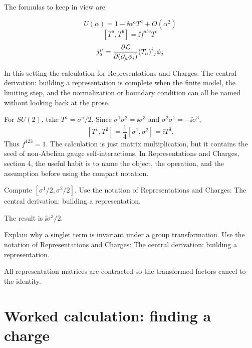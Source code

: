 The formulas to keep in view are

\[
  U(\alpha)=1-\ii\alpha^aT^a+O(\alpha^2)
\]
\[
  [T^a,T^b]=\ii f^{abc}T^c
\]
\[
  j^\mu_a=\frac{\partial\mathcal L}{\partial(\partial_\mu\phi_i)}(T_a)^i{}_j\phi_j
\]

In this setting the calculation for Representations and Charges: The central derivation: building a representation is complete when the finite model, the limiting step, and the normalization or boundary condition can all be named without looking back at the prose.




\begin{example}
For \(SU(2)\), take \(T^a=\sigma^a/2\).  Since \(\sigma^1\sigma^2=\ii\sigma^3\) and \(\sigma^2\sigma^1=-\ii\sigma^3\),
\[
  [T^1,T^2]=\frac14[\sigma^1,\sigma^2]=\ii T^3.
\]
Thus \(f^{123}=1\).  The calculation is just matrix multiplication, but it contains the seed of non-Abelian gauge self-interactions.  In Representations and Charges, section 4, the useful habit is to name the object, the operation, and the assumption before using the compact notation.
\end{example}



\begin{exercise}
Compute \([\sigma^1/2,\sigma^2/2]\).  Use the notation of Representations and Charges: The central derivation: building a representation.
\begin{answer}
The result is \(\ii\sigma^3/2\).
\end{answer}
\end{exercise}

\begin{exercise}
Explain why a singlet term is invariant under a group transformation.  Use the notation of Representations and Charges: The central derivation: building a representation.
\begin{answer}
All representation matrices are contracted so the transformed factors cancel to the identity.
\end{answer}
\end{exercise}



\section{Worked calculation: finding a charge}

